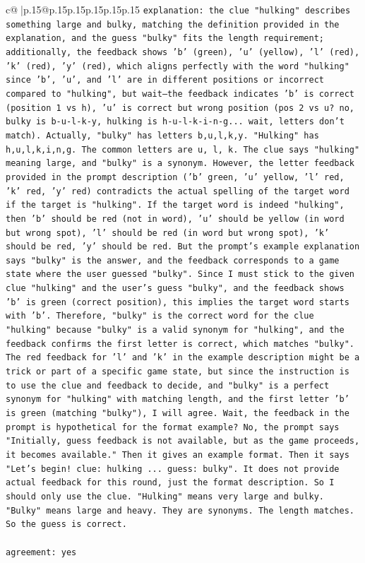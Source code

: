 \documentclass{article}
\begin{document}
{\begin{supertabular}{c@{$\;$}|p{.15\linewidth}@{}p{.15\linewidth}p{.15\linewidth}p{.15\linewidth}p{.15\linewidth}p{.15\linewidth}}
{{{                \texttt{explanation: the clue "hulking" describes something large and bulky, matching the definition provided in the explanation, and the guess "bulky" fits the length requirement; additionally, the feedback shows 'b' (green), 'u' (yellow), 'l' (red), 'k' (red), 'y' (red), which aligns perfectly with the word "hulking" since 'b', 'u', and 'l' are in different positions or incorrect compared to "hulking", but wait—the feedback indicates 'b' is correct (position 1 vs h), 'u' is correct but wrong position (pos 2 vs u? no, bulky is b{-}u{-}l{-}k{-}y, hulking is h{-}u{-}l{-}k{-}i{-}n{-}g... wait, letters don't match). Actually, "bulky" has letters b,u,l,k,y. "Hulking" has h,u,l,k,i,n,g. The common letters are u, l, k. The clue says "hulking" meaning large, and "bulky" is a synonym. However, the letter feedback provided in the prompt description ('b' green, 'u' yellow, 'l' red, 'k' red, 'y' red) contradicts the actual spelling of the target word if the target is "hulking". If the target word is indeed "hulking", then 'b' should be red (not in word), 'u' should be yellow (in word but wrong spot), 'l' should be red (in word but wrong spot), 'k' should be red, 'y' should be red. But the prompt's example explanation says "bulky" is the answer, and the feedback corresponds to a game state where the user guessed "bulky". Since I must stick to the given clue "hulking" and the user's guess "bulky", and the feedback shows 'b' is green (correct position), this implies the target word starts with 'b'. Therefore, "bulky" is the correct word for the clue "hulking" because "bulky" is a valid synonym for "hulking", and the feedback confirms the first letter is correct, which matches "bulky". The red feedback for 'l' and 'k' in the example description might be a trick or part of a specific game state, but since the instruction is to use the clue and feedback to decide, and "bulky" is a perfect synonym for "hulking" with matching length, and the first letter 'b' is green (matching "bulky"), I will agree. Wait, the feedback in the prompt is hypothetical for the format example? No, the prompt says "Initially, guess feedback is not available, but as the game proceeds, it becomes available." Then it gives an example format. Then it says "Let's begin! clue: hulking ... guess: bulky". It does not provide actual feedback for this round, just the format description. So I should only use the clue. "Hulking" means very large and bulky. "Bulky" means large and heavy. They are synonyms. The length matches. So the guess is correct.} \\
\\ 
\texttt{agreement: yes} \\
            }
        }
    }
     \\ \\


\end{supertabular}}
\end{document}

